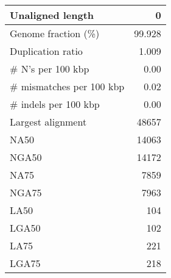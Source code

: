 \documentclass[12pt,a4paper]{article}
\begin{document}
\begin{table}[ht]
\begin{center}
\begin{tabular}{|l*{1}{|r}|}
Unaligned length & 0 \\ \hline
Genome fraction (\%) & 99.928 \\ \hline
Duplication ratio & 1.009 \\ \hline
\# N's per 100 kbp & 0.00 \\ \hline
\# mismatches per 100 kbp & 0.02 \\ \hline
\# indels per 100 kbp & 0.00 \\ \hline
Largest alignment & 48657 \\ \hline
NA50 & 14063 \\ \hline
NGA50 & 14172 \\ \hline
NA75 & 7859 \\ \hline
NGA75 & 7963 \\ \hline
LA50 & 104 \\ \hline
LGA50 & 102 \\ \hline
LA75 & 221 \\ \hline
LGA75 & 218 \\ \hline
\end{tabular}
\end{center}
\end{table}
\end{document}
